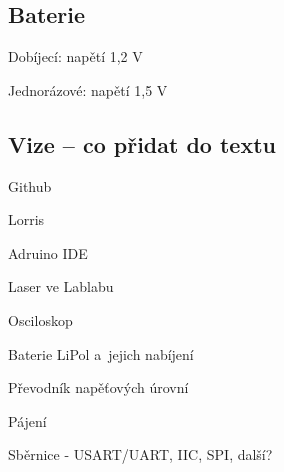 \subsection{Baterie}

Dobíjecí: napětí 1,2 V~

Jednorázové: napětí 1,5 V~
 
\subsection{Vize -- co přidat do textu}

Github

Lorris

Adruino IDE 

Laser ve Lablabu 

Osciloskop

Baterie LiPol a~jejich nabíjení 

Převodník napěťových úrovní 

Pájení 

Sběrnice - USART/UART, IIC, SPI, další?
